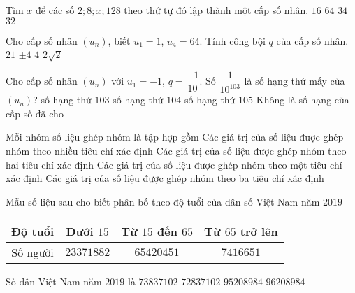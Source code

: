 \begin{ex}%
	Tìm $x$ để các số $2;8;x;128$ theo thứ tự đó lập thành một cấp số nhân.
	\choice
	{$16$}
	{$64$}
	{$34$}
	{\True $32$}
\end{ex}
\begin{ex}%
	Cho cấp số nhân $\left(u_{n}\right)$, biết $u_{1}=1$, $u_{4}=64$. Tính công bội $q$ của cấp số nhân.
	\choice
	{$21$}
	{$\pm4$}
	{\True $4$}
	{$2\sqrt{2}$}
\end{ex}
\begin{ex}%
	Cho cấp số nhân $\left(u_{n}\right)$ với $u_{1}=-1$, $q=\dfrac{-1}{10}$. Số $\dfrac{1}{10^{103}}$ là số hạng thứ mấy của $\left(u_{n}\right)$?
	\choice
	{số hạng thứ $103$}
	{\True số hạng thứ $104$}
	{số hạng thứ $105$}
	{Không là số hạng của cấp số đã cho}
\end{ex}
\begin{ex}%
	Mỗi nhóm số liệu ghép nhóm là tập hợp gồm
	\choice
	{Các giá trị của số liệu được ghép nhóm theo nhiều tiêu chí xác định}
	{Các giá trị của số liệu được ghép nhóm theo hai tiêu chí xác định}
	{\True Các giá trị của số liệu được ghép nhóm theo một tiêu chí xác định}
	{Các giá trị của số liệu được ghép nhóm theo ba tiêu chí xác định}
\end{ex}
\begin{ex}%
	Mẫu số liệu sau cho biết phân bố theo độ tuổi của dân số Việt Nam năm $2019$\\
	\begin{center}
		\begin{tabular}{|c|c|c|c|}
		\hline
		Độ tuổi& Dưới $15$ & Từ $15$ đến $65$ & Từ $65$ trở lên\\
		\hline
		Số người& $23 371 882$ & $65 420 451$ & $7 416 651$\\
		\hline
	\end{tabular}
	\end{center}
	Số dân Việt Nam năm $2019$ là
	\choice
	{$73837102$}
	{$72837102$}
	{$95208984$}
	{\True $96208984$}
\end{ex}
